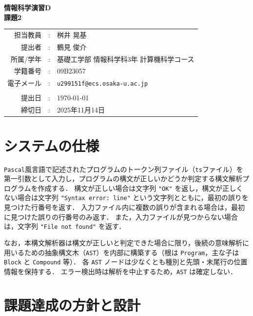 \documentclass[a4j,10pt]{jarticle}
\makeatletter
\newcommand{\teacherName}{桝井 晃基}
\newcommand{\studentName}{鶴見 俊介}
\newcommand{\studentAff}{基礎工学部 情報科学科3年 計算機科学コース}
\newcommand{\studentID}{09B23057}
\newcommand{\studentEmail}{u299151f@ecs.osaka-u.ac.jp}
\newcommand{\submitted}{\today}
\newcommand{\deadline}{2025年11月14日}
\makeatother
\begin{document}
\begin{titlepage}
\begin{center}
{\Huge\bfseries 情報科学演習D} \\
\vspace{1cm}
{\LARGE\bfseries 課題2}
\vspace{5cm}

{\large
\begin{tabular}{rcl}
担当教員 & : & \teacherName \\
提出者   & : & \studentName \\
所属/学年   & : & \studentAff\\
学籍番号 & : & \studentID \\
電子メール & : & \texttt{\studentEmail}\\
&& \\
提出日 & : & \submitted \\
締切日 & : & \deadline
\end{tabular}
}
\end{center}
\end{titlepage}

\setcounter{tocdepth}{2}
\newpage

% 


\section{システムの仕様}
\verb|Pascal|風言語で記述されたプログラムのトークン列ファイル（\verb|ts|ファイル）を第一引数として入力し，プログラムの構文が正しいかどうか判定する構文解析プログラムを作成する．
構文が正しい場合は文字列 \verb|"OK"| を返し，構文が正しくない場合は文字列 \verb|"Syntax error: line"| という文字列とともに，最初の誤りを見つけた行番号を返す．
入力ファイル内に複数の誤りが含まれる場合は，最初に見つけた誤りの行番号のみ返す．
また，入力ファイルが見つからない場合は，文字列 \verb|"File not found"| を返す．

なお，本構文解析器は構文が正しいと判定できた場合に限り，後続の意味解析に用いるための抽象構文木（\verb|AST|）を内部に構築する（根は \verb|Program|，主な子は \verb|Block| と \verb|Compound| 等）．
各 \verb|AST| ノードは少なくとも種別と先頭・末尾行の位置情報を保持する．
エラー検出時は解析を中止するため，\verb|AST| は確定しない．

\section{課題達成の方針と設計}
\end{document}
